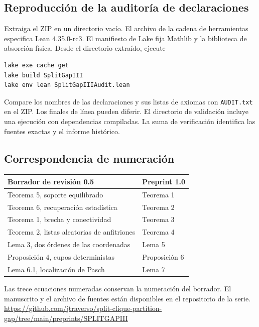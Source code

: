\documentclass[spanish,11pt,a4paper]{article}
\newcounter{none}
\begin{document}
\subsection{Reproducción de la auditoría de declaraciones}\label{reproducciuxf3n-de-la-auditoruxeda-de-declaraciones}

Extraiga el ZIP en un directorio vacío. El archivo de la cadena de herramientas especifica Lean 4.35.0-rc3. El manifiesto de Lake fija Mathlib y la biblioteca de absorción física. Desde el directorio extraído, ejecute

\begin{verbatim}
lake exe cache get
lake build SplitGapIII
lake env lean SplitGapIIIAudit.lean
\end{verbatim}

Compare los nombres de las declaraciones y sus listas de axiomas con \texttt{AUDIT.txt} en el ZIP. Los finales de línea pueden diferir. El directorio de validación incluye una ejecución con dependencias compiladas. La suma de verificación identifica las fuentes exactas y el informe histórico.

\subsection{Correspondencia de numeración}\label{correspondencia-de-numeraciuxf3n}

{\def\LTcaptype{none} %
\begin{longtable}[]{@{}ll@{}}
\toprule\noalign{}
Borrador de revisión 0.5 & Preprint 1.0 \\
\midrule\noalign{}
\endhead
\bottomrule\noalign{}
\endlastfoot
Teorema 5, soporte equilibrado & Teorema 1 \\
Teorema 6, recuperación estadística & Teorema 2 \\
Teorema 1, brecha y conectividad & Teorema 3 \\
Teorema 2, listas aleatorias de anfitriones & Teorema 4 \\
Lema 3, dos órdenes de las coordenadas & Lema 5 \\
Proposición 4, cupos deterministas & Proposición 6 \\
Lema 6.1, localización de Pasch & Lema 7 \\
\end{longtable}
}

Las trece ecuaciones numeradas conservan la numeración del borrador. El manuscrito y el archivo de fuentes están disponibles en el repositorio de la serie. \url{https://github.com/jtraverso/split-clique-partition-gap/tree/main/preprints/SPLITGAPIII}
\end{document}
